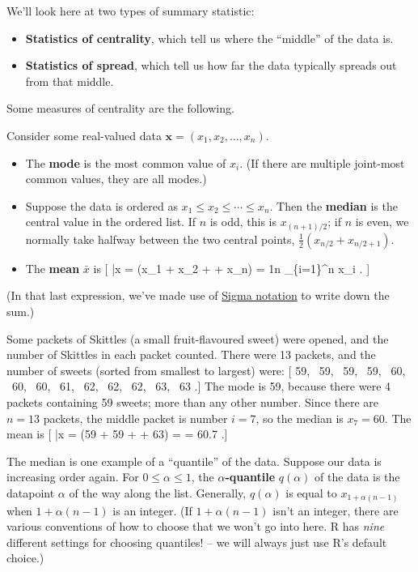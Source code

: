 \documentclass[
  letterpaper,
]{report}
\providecommand{\tightlist}{%
  \setlength{\itemsep}{0pt}\setlength{\parskip}{0pt}}\usepackage{longtable,booktabs,array}
\theoremstyle{definition}
\theoremstyle{definition}
\theoremstyle{remark}
\begin{document}
We'll look here at two types of summary statistic:

\begin{itemize}
\tightlist
\item
  \textbf{Statistics of centrality}, which tell us where the ``middle''
  of the data is.
\item
  \textbf{Statistics of spread}, which tell us how far the data
  typically spreads out from that middle.
\end{itemize}

Some measures of centrality are the following.

Consider some real-valued data \(\mathbf x = (x_1, x_2, \dots, x_n)\).

\begin{itemize}
\tightlist
\item
  The \textbf{mode} is the most common value of \(x_i\). (If there are
  multiple joint-most common values, they are all modes.)
\item
  Suppose the data is ordered as \(x_1 \leq x_2 \leq \cdots \leq x_n\).
  Then the \textbf{median} is the central value in the ordered list. If
  \(n\) is odd, this is \(x_{(n+1)/2}\); if \(n\) is even, we normally
  take halfway between the two central points,
  \(\frac12(x_{n/2}+x_{n/2 + 1})\).
\item
  The \textbf{mean} \(\bar x\) is {[} \bar x = (x\_1 + x\_2 +
  \cdots + x\_n) = \frac1n \sum\_\{i=1\}\^{}n x\_i . {]}
\end{itemize}

(In that last expression, we've made use of
\href{https://www.mathcentre.ac.uk/resources/workbooks/mathcentre/sigma.pdf}{Sigma
notation} to write down the sum.)

Some packets of Skittles (a small fruit-flavoured sweet) were opened,
and the number of Skittles in each packet counted. There were 13
packets, and the number of sweets (sorted from smallest to largest)
were: {[} 59, ~59, ~59, ~59, ~60, ~60, ~60, ~61, ~62, ~62, ~62, ~63, ~63
.{]} The mode is 59, because there were 4 packets containing 59 sweets;
more than any other number. Since there are \(n = 13\) packets, the
middle packet is number \(i = 7\), so the median is \(x_7 = 60\). The
mean is {[} \bar x =  (59 + 59 + \cdots + 63) =
 = 60.7 .{]}

The median is one example of a ``quantile'' of the data. Suppose our
data is increasing order again. For \(0 \leq \alpha \leq 1\), the
\textbf{\(\alpha\)-quantile} \(q(\alpha)\) of the data is the datapoint
\(\alpha\) of the way along the list. Generally, \(q(\alpha)\) is equal
to \(x_{1+\alpha(n-1)}\) when \(1+\alpha(n-1)\) is an integer. (If
\(1+\alpha(n-1)\) isn't an integer, there are various conventions of how
to choose that we won't go into here. R has \emph{nine} different
settings for choosing quantiles! -- we will always just use R's default
choice.)
\end{document}
